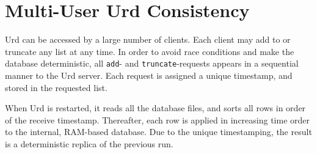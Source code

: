 







\section{Multi-User Urd Consistency}
Urd can be accessed by a large number of clients.  Each client may add
to or truncate any list at any time.  In order to avoid race
conditions and make the database deterministic, all \texttt{add}-
and \texttt{truncate}-requests appears in a sequential manner to the
Urd server.  Each request is assigned a unique timestamp, and stored
in the requested list.

When Urd is restarted, it reads all the database files, and sorts all
rows in order of the receive timestamp.  Thereafter, each row is
applied in increasing time order to the internal, RAM-based database.
Due to the unique timestamping, the result is a deterministic replica
of the previous run.
